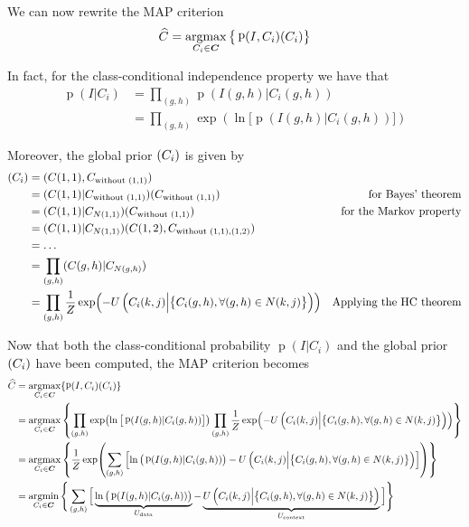 \documentclass[oneside,onecolumn]{report}
\DeclareMathOperator*{\argmax}{argmax}
\DeclareMathOperator*{\argmin}{argmin}
\DeclareMathOperator*{\pdf}{p}
\let\P\relax
\DeclareMathOperator*{\P}{P}
\begin{document}
We can now rewrite the MAP criterion
$$ \widehat C = \argmax_{C_i \in \bm C} \big\{ \pdf(I, C_i) \P(C_i)  \big\} $$

In fact, for the class-conditional independence property we have that
\begin{align*}
    \pdf(I | C_i)
    &= \prod_{(g, h)} \pdf(I(g, h) | C_i(g, h)) \\
    &= \prod_{(g, h)} \exp(\ln \big[ \pdf(I(g, h) | C_i(g, h)) \big] )
\end{align*}

Moreover, the global prior $\P(C_i)$ is given by
\begin{align*}
    \P(C_i)
    &= \P(C(1, 1), C_{\text{without } (1, 1)}) \\
    &= \P(C(1, 1) | C_{\text{without } (1, 1)}) \P(C_{\text{without } (1, 1)}) & \text{for Bayes' theorem} \\
    &= \P(C(1, 1) | C_{N(1, 1)}) \P(C_{\text{without } (1, 1)}) & \text{for the Markov property} \\
    &= \P(C(1, 1) | C_{N(1, 1)}) \P(C(1, 2), C_{\text{without } (1, 1), (1, 2)}) \\
    &= \dots \\
    &= \prod_{(g, h)} \P(C(g, h) | C_{N(g, h)}) \\
    &= \prod_{(g, h)} \frac{1}{Z} \exp(-U \left( C_i(k, j) \Big| \big\{ C_i(g, h), \forall (g, h) \in N(k, j) \big\} \right)) & \text{Applying the HC theorem}
\end{align*}

Now that both the class-conditional probability $\pdf(I | C_i)$ and the global prior $\P(C_i)$ have been computed, the MAP criterion becomes
\begin{align*}
    \widehat C
    &= \argmax_{C_i \in \bm C}\{ \pdf(I, C_i) \P(C_i) \} \\
    &= \argmax_{C_i \in \bm C}
    \left\{
        \prod_{(g, h)} \exp(\ln \big[ \pdf(I(g, h) | C_i(g, h)) \big] )
        \prod_{(g, h)} \frac{1}{Z} \exp(-U \left( C_i(k, j) \Big| \big\{ C_i(g, h), \forall (g, h) \in N(k, j) \big\} \right))
    \right\} \\
    &= \argmax_{C_i \in \bm C}
    \left\{
    \frac{1}{Z}
    \exp(
        \sum_{(g, h)} \left[
            \ln \big( \pdf(I(g, h) | C_i(g, h)) \big)
            -U \left( C_i(k, j) \Big| \big\{ C_i(g, h), \forall (g, h) \in N(k, j) \big\} \right)
        \right]
    )
    \right\} \\
    &= \argmin_{C_i \in \bm C}
    \Bigg\{
        \sum_{(g, h)} \Big[
            \underbrace{\ln \big( \pdf(I(g, h) | C_i(g, h)) \big)}_{U_\text{data}}
            -
            \underbrace{U \left( C_i(k, j) \Big| \big\{ C_i(g, h), \forall (g, h) \in N(k, j) \big\} \right)}_{U_\text{context}}
        \Big]
    \Bigg\}
\end{align*}
\end{document}
